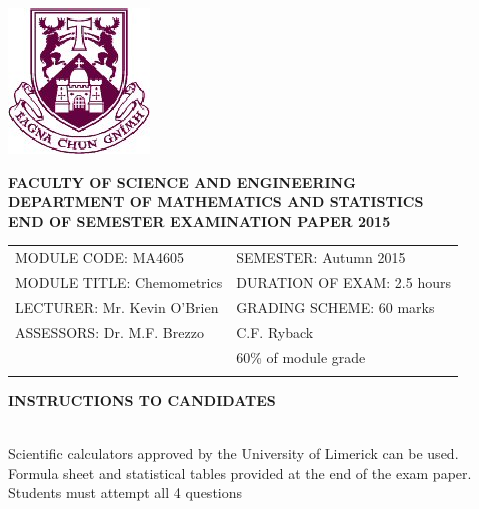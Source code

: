 \documentclass[a4paper,12pt]{article}
\begin{document}
\begin{center}
       \includegraphics[scale=0.75]{image/shieldtransparent2}
\end{center}

\begin{center}
\vspace{1cm}
\large \bf {FACULTY OF SCIENCE AND ENGINEERING} \\[0.5cm]
\normalsize DEPARTMENT OF MATHEMATICS AND STATISTICS \\[1.25cm]
\large \bf {END OF SEMESTER EXAMINATION PAPER 2015} \\[1.5cm]
\end{center}

\begin{tabular}{ll}
MODULE CODE: MA4605 & SEMESTER: Autumn 2015 \\[1cm]
MODULE TITLE: Chemometrics & DURATION OF EXAM: 2.5 hours \\[1cm]
LECTURER: Mr. Kevin O'Brien & GRADING SCHEME: 60 marks \\[1cm]
ASSESSORS: Dr. M.F. Brezzo & C.F. Ryback \\[1cm]
& \phantom{GRADING SCHEME:} \footnotesize {60\% of module grade} \\[0.8cm]
\\[1cm]
\end{tabular}
\begin{center}
{\bf INSTRUCTIONS TO CANDIDATES}
\end{center}

{\noindent \\ Scientific calculators approved by the University of Limerick can be used. \\
Formula sheet and statistical tables provided at the end of the exam paper.\\
Students must attempt all 4 questions}
\newpage



\end{document}
